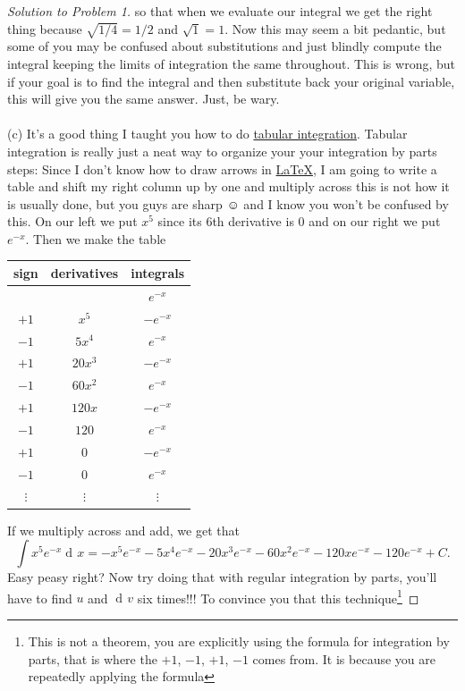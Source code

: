 \documentclass[12pt]{article}
\theoremstyle{plain}
\theoremstyle{definition}
\theoremstyle{remark}
\DeclareMathOperator{\diff}{d\!}
\begin{document}
\begin{proof}[Solution to Problem 1]
so that when we evaluate our integral we get the right thing because
$\sqrt{1/4}=1/2$ and $\sqrt{1}=1$. Now this may seem a bit pedantic, but
some of you may be confused about substitutions and just blindly compute
the integral keeping the limits of integration the same throughout. This is
wrong, but if your goal is to find the integral and then substitute back
your original variable, this will give you the same answer. Just, be wary.
\\\\
(c) It's a good thing I taught you how to do
\href{https://en.wikipedia.org/wiki/Integration_by_parts#Tabular_integration_by_parts}{tabular
  integration}. Tabular integration is really just a neat way to organize
your your integration by parts steps: Since I don't know how to draw arrows
in \href{https://en.wikipedia.org/wiki/LaTeX}{\LaTeX}, I am going to write
a table and shift my right column up by one and multiply across this is not
how it is usually done, but you guys are sharp $\smiley$ and I know you
won't be confused by this. On our left we put $x^5$ since its $6$th
derivative is $0$ and on our right we put $e^{-x}$. Then we make the table
\begin{center}
\begin{tabular}{|c|c|c|}
\hline
sign&derivatives&integrals\\
\hline
~&~&$e^{-x}$\\
$+1$&$x^5$&$-e^{-x}$\\
$-1$&$5x^4$&$e^{-x}$\\
$+1$&$20x^3$&$-e^{-x}$\\
$-1$&$60x^2$&$e^{-x}$\\
$+1$&$120x$&$-e^{-x}$\\
$-1$&$120$&$e^{-x}$\\
$+1$&$0$&$-e^{-x}$\\
$-1$&$0$&$e^{-x}$\\
$\vdots$&$\vdots$&$\vdots$\\
\hline
\end{tabular}
\end{center}
If we multiply across and add, we get that
\[
\int x^5e^{-x}\diff x=
\boxed{-x^5e^{-x}-5x^4e^{-x}-20x^3e^{-x}-60x^2e^{-x}-120xe^{-x}-120e^{-x}+C.}
\]
Easy peasy right? Now try doing that with regular integration by parts,
you'll have to find $u$ and $\diff v$ six times!!!
To convince you that this technique\footnote{This is not a
  theorem, you are explicitly using the formula for integration by
  parts, that is where the $+1$, $-1$, $+1$, $-1$ comes from. It is because
you are repeatedly applying the formula
}
\end{proof}
\end{document}
